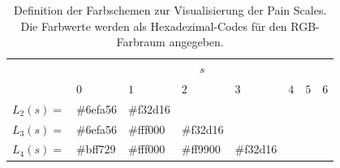 \begin{table}[h]
\centering
\caption{Definition der Farbschemen zur Visualisierung der Pain Scales. Die Farbwerte werden als Hexadezimal-Codes für den RGB-Farbraum angegeben. }
\label{tab:color_shemes}
\begin{tabular}{@{}llllllll@{}}
\toprule
                   & \multicolumn{7}{c}{$s$}                                                                                                                                                                                                                                                                                                                                                                      \\ 
                       & $0$                                                     & $1$                                                     & $2$                                                     & $3$                                                     & $4$                                                     & $5$                                                     & $6$                                                     \\ \midrule
\multicolumn{1}{l|}{$L_2(s) = $} & \multicolumn{1}{l|}{\cellcolor[HTML]{6EFA56}\#6efa56} & \multicolumn{1}{l|}{\cellcolor[HTML]{F32D16}\#f32d16} &                                                       &                                                       &                                                       &                                                       &                                                       \\ \cmidrule(lr){2-4}
\multicolumn{1}{l|}{$L_3(s) = $} & \multicolumn{1}{l|}{\cellcolor[HTML]{6EFA56}\#6efa56} & \multicolumn{1}{l|}{\cellcolor[HTML]{FFF000}\#fff000} & \multicolumn{1}{l|}{\cellcolor[HTML]{F32D16}\#f32d16} &                                                       &                                                       &                                                       &                                                       \\ \cmidrule(lr){2-5}
\multicolumn{1}{l|}{$L_4(s) = $} & \multicolumn{1}{l|}{\cellcolor[HTML]{B6F52B}\#bff729} & \multicolumn{1}{l|}{\cellcolor[HTML]{FFF000}\#fff000} & \multicolumn{1}{l|}{\cellcolor[HTML]{F98E0B}\#ff9900} & \multicolumn{1}{l|}{\cellcolor[HTML]{F32D16}\#f32d16} &       &                                                       &                                                       \\ \cmidrule(lr){2-6}

\end{tabular}
\end{table}
